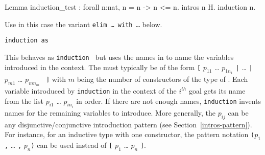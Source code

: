 \begin{coq_example*}

\Example

\begin{coq_example}
Lemma induction_test : forall n:nat, n = n -> n <= n.
intros n H.
induction n.
\end{coq_example}

\begin{ErrMsgs}
\item {}
\item {}

  Use in this case
  the variant {\tt elim \dots\ with \dots} below.
\end{ErrMsgs}

\begin{Variants}
\item{\tt induction {\term} as {\disjconjintropattern}}

  This behaves as {\tt induction {\term}} but uses the names in
  {\disjconjintropattern} to name the variables introduced in the context.
  The {\disjconjintropattern} must typically be of the form
  {\tt [} $p_{11}$ {\ldots}
  $p_{1n_1}$ {\tt |} {\ldots} {\tt |} $p_{m1}$ {\ldots} $p_{mn_m}$ {\tt
    ]} with $m$ being the number of constructors of the type of
  {\term}. Each variable introduced by {\tt induction} in the context
  of the $i^{th}$ goal gets its name from the list $p_{i1}$ {\ldots}
  $p_{in_i}$ in order. If there are not enough names, {\tt induction}
  invents names for the remaining variables to introduce. More
  generally, the $p_{ij}$ can be any disjunctive/conjunctive
  introduction pattern (see Section~\ref{intros-pattern}). For instance,
  for an inductive type with one constructor, the pattern notation
  {\tt (}$p_{1}$ {\tt ,} {\ldots} {\tt ,} $p_{n}${\tt )} can be used instead of
  {\tt [} $p_{1}$ {\ldots} $p_{n}$ {\tt ]}.


\end{Variants}
\end{coq_example*}
